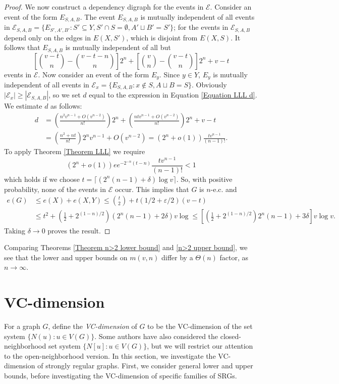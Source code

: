 \documentclass{article}
\theoremstyle{definition}
\begin{document}
\begin{proof}
We now construct a dependency digraph for the events in $\mathcal E$. Consider an event of the form $E_{S,A,B}$. The event $E_{S,A,B}$ is mutually independent of all events in $\mathcal E_{S,A,B}=\{E_{S',A',B'}:S'\subseteq Y,S'\cap S=\emptyset,A'\sqcup B'=S'\}$; for the events in $\mathcal E_{S,A,B}$ depend only on the edges in $E(X,S')$, which is disjoint from $E(X,S)$. It follows that $E_{S,A,B}$ is mutually independent of all but 
\begin{equation} \label{Equation LLL d}
\left[\binom{v-t}{n}-\binom{v-t-n}{n}\right]2^n+\left[\binom{v}{n}-\binom{v-t}{n}\right]2^n+v-t
\end{equation}
events in $\mathcal E$. Now consider an event of the form $E_y$. Since $y\in Y$, $E_y$ is mutually independent of all events in $\mathcal E_x=\{E_{S,A,B}:x\not\in S,A\sqcup B=S\}.$ Obviously $|\mathcal E_x|\ge|\mathcal E_{S,A,B}|$, so we set
$d$ equal to the expression in Equation \ref{Equation LLL d}. We estimate $d$ as follows:
$$\begin{aligned}
    d&=\left(\frac{n^2v^{n-1}+O(v^{n-2})}{n!}\right)2^n+\left(\frac{ntv^{n-1}+O(v^{n-2})}{n!}\right)2^n+v-t\\
    &=\left(\frac{n^2+nt}{n!}\right)2^nv^{n-1}+O(v^{n-2})=(2^n+o(1))\frac{tv^{n-1}}{(n-1)!}.
\end{aligned}$$
To apply Theorem \ref{Theorem LLL} we require
$$(2^n+o(1))ee^{-2^{-n}(t-n)}\frac{tv^{n-1}}{(n-1)!}<1$$
which holds if we choose $t=\lceil(2^n(n-1)+\delta)\log v\rceil$. So, with positive probability, none of the events in $\mathcal E$ occur. This implies that $G$ is $n$-e.c. and
$$\begin{aligned}e(G)&\le e(X)+e(X,Y)\le\binom{t}{2}+t(1/2+\varepsilon/2)(v-t)\\
&\le t^2+\left(\frac{1}{2}+2^{(1-n)/2}\right)(2^n(n-1)+2\delta)v\log\le \left[\left(\frac{1}{2}+2^{(1-n)/2}\right)2^n(n-1)+3\delta\right] v\log v.\end{aligned}$$
Taking $\delta\to 0$ proves the result.
\end{proof}

Comparing Theorems \ref{Theorem n>2 lower bound} and \autoref{n>2 upper bound}, we see that the lower and upper bounds on $m(v,n)$ differ by a $\Theta(n)$ factor, as $n\to\infty$.

\section{VC-dimension}

For a graph $G$, define the \textit{VC-dimension} of $G$ to be the VC-dimension of the set system $\{N(u):u\in V(G)\}$. Some authors have also considered the closed-neighborhood set system $\{N[u]:u\in V(G)\}$, but we will restrict our attention to the open-neighborhood version. In this section, we investigate the VC-dimension of strongly regular graphs. First, we consider general lower and upper bounds, before investigating the VC-dimension of specific families of SRGs.
\end{document}
